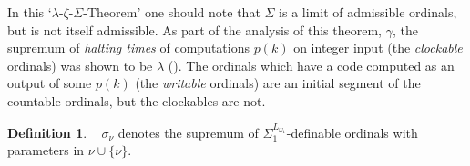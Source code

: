 \documentclass[a4paper,11pt]{amsart}
\theoremstyle{definition}
\newtheorem{definition}[fact]{Definition}
\newtheorem*{problem A}{Problem 1}
\newtheorem*{problem B}{Problem 2}
\theoremstyle{remark}
\newenvironment{enumerate-(1)}{\begin{enumerate}[label={\upshape (\arabic*)}, leftmargin=2pc]}{\end{enumerate}}
\begin{document}
In this  `$\lambda$-$\zeta$-$\Sigma$-Theorem' one should note that $\Sigma$ is a limit of admissible ordinals, but is not itself admissible. As part of the analysis of this theorem, $\gamma$, the supremum of {\em halting times} of computations $p(k)$ 
on integer   input (the \emph{clockable} ordinals) was shown to be $\lambda$ (\cite{welch2000length}). The ordinals which have a code computed as an output of some $p(k)$ 
(the \emph{writable} ordinals) are an initial segment of the countable ordinals, but the clockables are not.



\begin{definition} \ 
$\sigma_\nu$ denotes the supremum of $\Sigma_1^{L_{\omega_1}}$-definable ordinals with parameters in $\nu\cup\{\nu\}$. 
\end{definition} 
\end{document}
